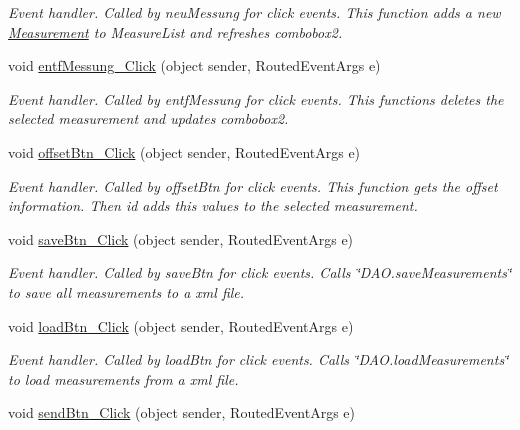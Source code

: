 \begin{DoxyCompactItemize}
\begin{DoxyCompactList}\small\item\em Event handler. Called by neu\+Messung for click events. This function adds a new \hyperlink{class_l_i_d_a_r___controller_1_1_measurement}{Measurement} to Measure\+List and refreshes combobox2. \end{DoxyCompactList}\item 
void \hyperlink{class_l_i_d_a_r___controller_1_1_main_window_a94d838335feade09f122cad6a5600b74}{entf\+Messung\+\_\+\+Click} (object sender, Routed\+Event\+Args e)
\begin{DoxyCompactList}\small\item\em Event handler. Called by entf\+Messung for click events. This functions deletes the selected measurement and updates combobox2. \end{DoxyCompactList}\item 
void \hyperlink{class_l_i_d_a_r___controller_1_1_main_window_a786d1e5b609bbb158111051107ff860f}{offset\+Btn\+\_\+\+Click} (object sender, Routed\+Event\+Args e)
\begin{DoxyCompactList}\small\item\em Event handler. Called by offset\+Btn for click events. This function gets the offset information. Then id adds this values to the selected measurement. \end{DoxyCompactList}\item 
void \hyperlink{class_l_i_d_a_r___controller_1_1_main_window_a5897a8f1e59121209c0461bfd960b26a}{save\+Btn\+\_\+\+Click} (object sender, Routed\+Event\+Args e)
\begin{DoxyCompactList}\small\item\em Event handler. Called by save\+Btn for click events. Calls \char`\"{}\+D\+A\+O.\+save\+Measurements\char`\"{} to save all measurements to a xml file. \end{DoxyCompactList}\item 
void \hyperlink{class_l_i_d_a_r___controller_1_1_main_window_a3b7bbddaea2352a5c539b1d920a175b2}{load\+Btn\+\_\+\+Click} (object sender, Routed\+Event\+Args e)
\begin{DoxyCompactList}\small\item\em Event handler. Called by load\+Btn for click events. Calls \char`\"{}\+D\+A\+O.\+load\+Measurements\char`\"{} to load measurements from a xml file. \end{DoxyCompactList}\item 
void \hyperlink{class_l_i_d_a_r___controller_1_1_main_window_acea12fa391cab47bba07e6af85e4a765}{send\+Btn\+\_\+\+Click} (object sender, Routed\+Event\+Args e)

\end{DoxyCompactItemize}
